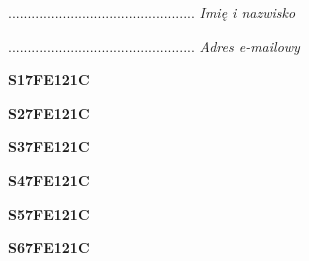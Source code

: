 \begin{turn}{90}\begin{minipage}{\linewidth} \vspace{20mm} ................................................  \textit{Imię i nazwisko}\end{minipage}\end{turn}

\begin{turn}{90}\begin{minipage}{\linewidth} \vspace{20mm} ................................................  \textit{Adres e-mailowy}\end{minipage}\end{turn}

\begin{turn}{90}\huge \begin{minipage}{\linewidth} \vspace{10mm}\textbf{S17FE121C}\end{minipage}\end{turn}

\begin{turn}{90}\huge \begin{minipage}{\linewidth} \vspace{10mm}\textbf{S27FE121C}\end{minipage}\end{turn}

\begin{turn}{90}\huge \begin{minipage}{\linewidth} \vspace{10mm}\textbf{S37FE121C}\end{minipage}\end{turn}

\begin{turn}{90}\huge \begin{minipage}{\linewidth} \vspace{10mm}\textbf{S47FE121C}\end{minipage}\end{turn}

\begin{turn}{90}\huge \begin{minipage}{\linewidth} \vspace{10mm}\textbf{S57FE121C}\end{minipage}\end{turn}

\begin{turn}{90}\huge \begin{minipage}{\linewidth} \vspace{10mm}\textbf{S67FE121C}\end{minipage}\end{turn}

